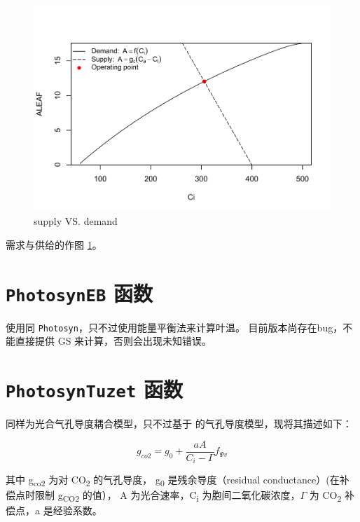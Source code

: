 \documentclass[
]{krantz}
\begin{document}
\begin{figure}
\centering
\includegraphics{bookdown_files/figure-latex/supply-1.pdf}
\caption{\label{fig:supply}supply VS. demand}
\end{figure}

需求与供给的作图 \ref{fig:supply}。

\hypertarget{photsyneb}{%
\section{\texorpdfstring{\texttt{PhotosynEB} 函数}{PhotosynEB 函数}}\label{photsyneb}}

使用同 \texttt{Photosyn}，只不过使用能量平衡法来计算叶温。
目前版本尚存在bug，不能直接提供 GS 来计算，否则会出现未知错误。

\hypertarget{photosyntuzet}{%
\section{\texorpdfstring{\texttt{PhotosynTuzet} 函数}{PhotosynTuzet 函数}}\label{photosyntuzet}}

同样为光合气孔导度耦合模型，只不过基于 \citet{tuzet2003a} 的气孔导度模型，现将其描述如下：

\begin{equation}
g_{co2} = g_0 + \frac{a A}{C_i - \Gamma} f_{\Psi v}
\label{eq:tuzet}
\end{equation}

其中 g\textsubscript{co2} 为对 CO\textsubscript{2} 的气孔导度， g\textsubscript{0} 是残余导度（residual conductance）(在补偿点时限制 g\textsubscript{CO2} 的值）， A 为光合速率，C\textsubscript{i} 为胞间二氧化碳浓度，\(\Gamma\) 为 CO\textsubscript{2} 补偿点，a 是经验系数。
\end{document}
